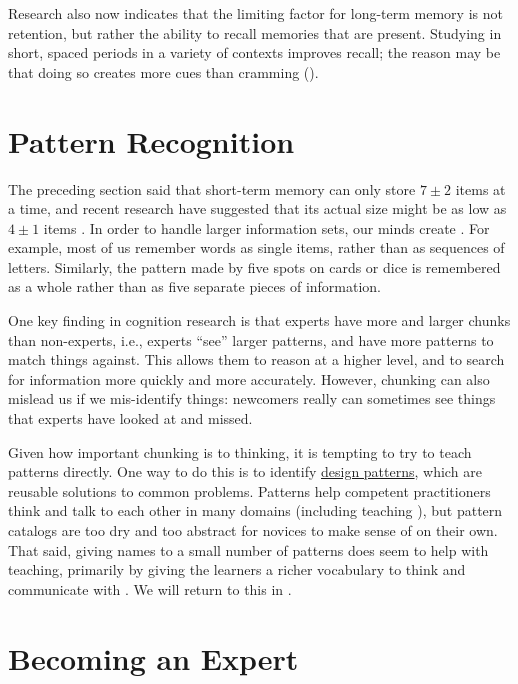 Research also now indicates that the limiting factor for long-term
memory is not retention, but rather the ability to recall memories
that are present.  Studying in short, spaced periods in a variety of
contexts improves recall; the reason may be that doing so creates more
cues than cramming ().

\section{Pattern Recognition}\label{s:memory-pattern}

The preceding section said that short-term memory can only store
$7{\pm}2$ items at a time, and recent research have suggested that its
actual size might be as low as $4{\pm}1$ items \cite{Dida2016}.  In
order to handle larger information sets, our minds create
. For example, most of us remember words
as single items, rather than as sequences of letters. Similarly, the
pattern made by five spots on cards or dice is remembered as a whole
rather than as five separate pieces of information.

One key finding in cognition research is that experts have more and
larger chunks than non-experts, i.e., experts ``see'' larger patterns,
and have more patterns to match things against. This allows them to
reason at a higher level, and to search for information more quickly
and more accurately.  However, chunking can also mislead us if we
mis-identify things: newcomers really can sometimes see things that
experts have looked at and missed.

Given how important chunking is to thinking, it is tempting to try to
teach patterns directly.  One way to do this is to identify
\href{https://en.wikipedia.org/wiki/Software_design_pattern}{design
  patterns}, which are reusable solutions to common problems. Patterns
help competent practitioners think and talk to each other in many
domains (including teaching \cite{Berg2012}), but pattern catalogs are
too dry and too abstract for novices to make sense of on their own.
That said, giving names to a small number of patterns does seem to
help with teaching, primarily by giving the learners a richer
vocabulary to think and communicate with
\cite{Kuit2004,Byck2005,Saja2006}.  We will return to this in
.

\section{Becoming an Expert}\label{s:memory-becoming-expert}

